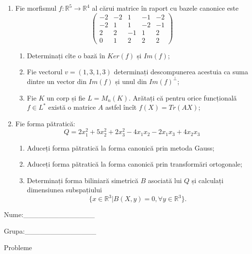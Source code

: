 \documentclass{article}
\begin{document}
\begin{enumerate}
 \item Fie morfismul $f:\mathbb{R}^5 \to \mathbb{R}^4$ al cărui matrice în raport cu bazele canonice este
$$\begin{pmatrix}
-2&-2&1&-1&-2\\
-2&1&1&-2&-1\\
2&2&-1&1&2\\
0&1&2&2&2
\end{pmatrix}$$

\begin{enumerate}
\item Determinați cîte o bază în $Ker(f)$ și $Im(f)$;
\item Fie vectorul $v=(1,3,1,3)$ determinați descompunerea acestuia ca suma dintre un vector din $Im(f)$ și unul din $Im(f)^\perp$;
\item Fie $K$ un corp și fie $L=M_n(K)$. Arătați că pentru orice funcțională $f \in L^*$ există o matrice $A$ astfel încît $f(X)=Tr(AX)$;
\end{enumerate}
\item Fie forma pătratică:
$$Q= 2x_1^2+5x_2^2+2x_3^2-4x_1x_2-2x_1x_3+4x_2x_3$$

\begin{enumerate}
\item Aduceți forma pătratică la forma canonică prin metoda Gauss;
\item Aduceți forma pătratică la forma canonică prin transformări ortogonale;
\item Determinați forma biliniară simetrică $B$ asociată lui $Q$ și calculați dimensiunea subspațiului
$$\{x \in \mathbb{R}^3 | B(X,y)=0,\forall y \in \mathbb{R}^3\}.$$

\end{enumerate}
\end{enumerate}
\newpage
\begin{flushright}
Nume:\_\_\_\_\_\_\_\_\_\_\_\_\_\_
 
 
Grupa:\_\_\_\_\_\_\_\_\_\_\_\_\_\_
\end{flushright}
\begin{center}
\vspace{2cm}
{\Large Probleme}
\vspace{2cm}
\end{center}
\end{document}
